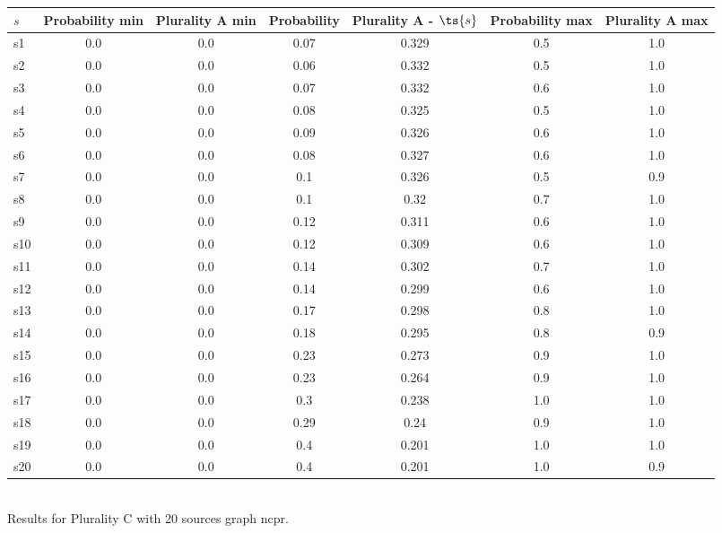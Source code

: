 \documentclass{article}
\begin{document}
\noindent\begin{tabular}{|l|c|c|c|c|c|c|}
\hline
$s$& Probability min & Plurality A min & Probability & Plurality A - $\ts{s}$ & Probability max & Plurality A max\\
\hline
s1 &0.0 & 0.0 & 0.07 & 0.329 & 0.5 & 1.0\\
\hline
s2 &0.0 & 0.0 & 0.06 & 0.332 & 0.5 & 1.0\\
\hline
s3 &0.0 & 0.0 & 0.07 & 0.332 & 0.6 & 1.0\\
\hline
s4 &0.0 & 0.0 & 0.08 & 0.325 & 0.5 & 1.0\\
\hline
s5 &0.0 & 0.0 & 0.09 & 0.326 & 0.6 & 1.0\\
\hline
s6 &0.0 & 0.0 & 0.08 & 0.327 & 0.6 & 1.0\\
\hline
s7 &0.0 & 0.0 & 0.1 & 0.326 & 0.5 & 0.9\\
\hline
s8 &0.0 & 0.0 & 0.1 & 0.32 & 0.7 & 1.0\\
\hline
s9 &0.0 & 0.0 & 0.12 & 0.311 & 0.6 & 1.0\\
\hline
s10 &0.0 & 0.0 & 0.12 & 0.309 & 0.6 & 1.0\\
\hline
s11 &0.0 & 0.0 & 0.14 & 0.302 & 0.7 & 1.0\\
\hline
s12 &0.0 & 0.0 & 0.14 & 0.299 & 0.6 & 1.0\\
\hline
s13 &0.0 & 0.0 & 0.17 & 0.298 & 0.8 & 1.0\\
\hline
s14 &0.0 & 0.0 & 0.18 & 0.295 & 0.8 & 0.9\\
\hline
s15 &0.0 & 0.0 & 0.23 & 0.273 & 0.9 & 1.0\\
\hline
s16 &0.0 & 0.0 & 0.23 & 0.264 & 0.9 & 1.0\\
\hline
s17 &0.0 & 0.0 & 0.3 & 0.238 & 1.0 & 1.0\\
\hline
s18 &0.0 & 0.0 & 0.29 & 0.24 & 0.9 & 1.0\\
\hline
s19 &0.0 & 0.0 & 0.4 & 0.201 & 1.0 & 1.0\\
\hline
s20 &0.0 & 0.0 & 0.4 & 0.201 & 1.0 & 0.9\\
\hline
\end{tabular}\\

\noindent Results for Plurality C with 20 sources graph ncpr.
\end{document}
